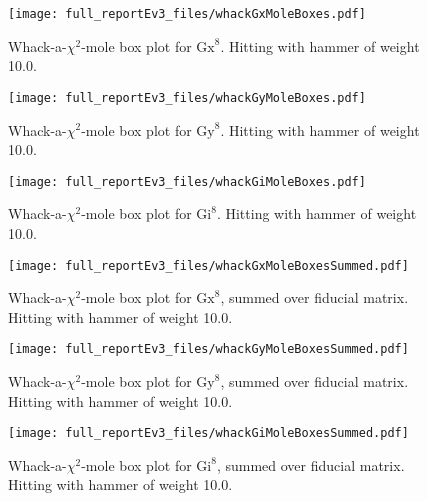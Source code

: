 {\begin{figure}
\begin{center}
\texttt{[image: full\_reportEv3\_files/whackGxMoleBoxes.pdf]}
\caption{Whack-a-$\chi^2$-mole box plot for $\mathrm{Gx}^{8}$.  Hitting with hammer of weight 10.0.\label{WhackGxMoleBoxPlot}}
\end{center}
\end{figure}

\begin{figure}
\begin{center}
\texttt{[image: full\_reportEv3\_files/whackGyMoleBoxes.pdf]}
\caption{Whack-a-$\chi^2$-mole box plot for $\mathrm{Gy}^{8}$.  Hitting with hammer of weight 10.0.\label{WhackGyMoleBoxPlot}}
\end{center}
\end{figure}

\begin{figure}
\begin{center}
\texttt{[image: full\_reportEv3\_files/whackGiMoleBoxes.pdf]}
\caption{Whack-a-$\chi^2$-mole box plot for $\mathrm{Gi}^{8}$.  Hitting with hammer of weight 10.0.\label{WhackGiMoleBoxPlot}}
\end{center}
\end{figure}

\begin{figure}
\begin{center}
\texttt{[image: full\_reportEv3\_files/whackGxMoleBoxesSummed.pdf]}
\caption{Whack-a-$\chi^2$-mole box plot for $\mathrm{Gx}^{8}$, summed over fiducial matrix.  Hitting with hammer of weight 10.0.\label{WhackGxMoleBoxPlotSummed}}
\end{center}
\end{figure}

\begin{figure}
\begin{center}
\texttt{[image: full\_reportEv3\_files/whackGyMoleBoxesSummed.pdf]}
\caption{Whack-a-$\chi^2$-mole box plot for $\mathrm{Gy}^{8}$, summed over fiducial matrix.  Hitting with hammer of weight 10.0.\label{WhackGyMoleBoxPlotSummed}}
\end{center}
\end{figure}

\begin{figure}
\begin{center}
\texttt{[image: full\_reportEv3\_files/whackGiMoleBoxesSummed.pdf]}
\caption{Whack-a-$\chi^2$-mole box plot for $\mathrm{Gi}^{8}$, summed over fiducial matrix.  Hitting with hammer of weight 10.0.\label{WhackGiMoleBoxPlotSummed}}
\end{center}
\end{figure}

}{}